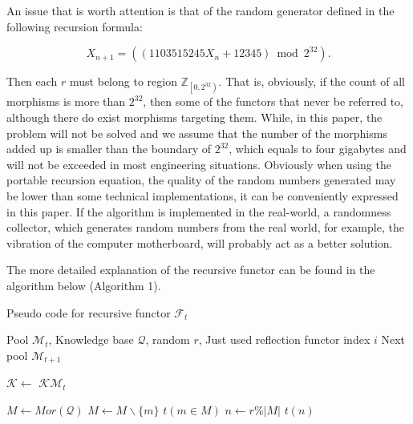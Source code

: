 \documentclass{aims}
\numberwithin{equation}{section}
\numberwithin{theorem}{section}	%
\numberwithin{axiom}{section}	%
\numberwithin{definition}{section}	%
\begin{document}
	An issue that is worth attention is that of the random generator defined in the following recursion formula: \cite{Entacher1997}
	
	\begin{equation*}
		X_{n+1}=(\left(1103515245 X_n+12345\right) \bmod 2^{32}).
	\end{equation*}
	
	Then each \(\mathit{r}\) must belong to region \(\mathbb{Z}_{\left.\left[0,2^{32}\right.\right)}\). That is, obviously, if the count of all morphisms is more than \(2^{32}\), then some of the functors that never be referred to, although there do exist morphisms targeting them. While, in this paper, the problem will not be solved and we assume that the number of the morphisms added up is smaller than the boundary of \(2^{32}\), which equals to four gigabytes and will not be exceeded in most engineering situations. Obviously when using the portable recursion equation, the quality of the random numbers generated may be lower than some technical implementations, it can be conveniently expressed in this paper. If the algorithm is implemented in the real-world, a randomness collector, which generates random numbers from the real world, for example, the vibration of the computer motherboard, will probably act as a better solution.
	
	The more detailed explanation of the recursive functor can be found in the algorithm below (Algorithm 1).
	
	\begin{algorithm}[h!]
		\caption{Pseudo code for recursive functor $\mathcal{F}_t$}
		\begin{algorithmic}[1]
			\Require Pool $\mathcal{M}_{t}$, Knowledge base $\mathcal{Q}$, random $\mathit{r}$, Just used reflection functor index $i$
			\Ensure Next pool $\mathcal{M}_{t+1}$
			
			\State $\mathcal{K} \gets $ 
			\State \Return $\mathcal{K} \mathcal{M}_t$
			\EndFunction
			
			\State $M \gets Mor(\mathcal{Q})$
			\State $M \gets M \backslash \{m\}$
			\EndIf
			\EndFor
			\State \Return $t(m \in M)$
			\Else
			\State $n \gets \mathit{r} \% |M|$
			\State \Return $t(n)$
			\EndIf
			\EndFunction
		\end{algorithmic}
	\end{algorithm}
	
\end{document}

